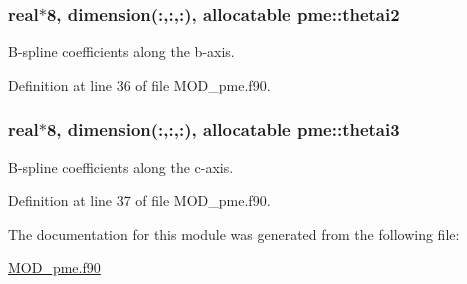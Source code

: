 \hypertarget{classpme_a8f1f382bf6f1d281ee730f2d28592011}{
\subsubsection[{thetai2}]{\setlength{\rightskip}{0pt plus 5cm}real$\ast$8, dimension(\-:,\-:,\-:), allocatable pme\-::thetai2}}\label{classpme_a8f1f382bf6f1d281ee730f2d28592011}


B-\/spline coefficients along the b-\/axis. 



Definition at line 36 of file M\-O\-D\-\_\-pme.\-f90.

\hypertarget{classpme_a4a9242f547e1368bfcf75f6e89da2127}{
\subsubsection[{thetai3}]{\setlength{\rightskip}{0pt plus 5cm}real$\ast$8, dimension(\-:,\-:,\-:), allocatable pme\-::thetai3}}\label{classpme_a4a9242f547e1368bfcf75f6e89da2127}


B-\/spline coefficients along the c-\/axis. 



Definition at line 37 of file M\-O\-D\-\_\-pme.\-f90.



The documentation for this module was generated from the following file\-:\begin{DoxyCompactItemize}
\item 
\hyperlink{MOD__pme_8f90}{M\-O\-D\-\_\-pme.\-f90}\end{DoxyCompactItemize}

